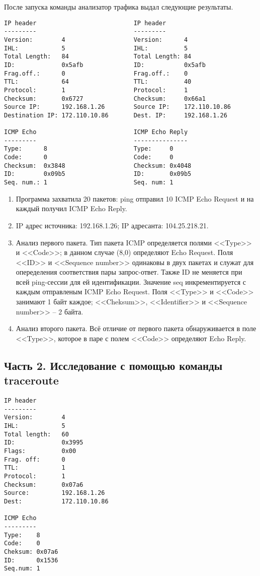 \documentclass[12pt, a4paper] {ncc}
\begin{document}
    После запуска команды анализатор трафика выдал следующие результаты.
    \begin{verbatim}
IP header                           IP header
---------                           ---------
Version:        4                   Version:      4
IHL:            5                   IHL:          5
Total Length:   84                  Total Length: 84
ID:             0x5afb              ID:           0x5afb
Frag.off.:      0                   Frag.off.:    0
TTL:            64                  TTL:          40
Protocol:       1                   Protocol:     1
Checksum:       0x6727              Checksum:     0x66a1
Source IP:      192.168.1.26        Source IP:    172.110.10.86
Destination IP: 172.110.10.86       Dest. IP:     192.168.1.26

ICMP Echo                           ICMP Echo Reply
---------                           ---------------
Type:      8                        Type:     0
Code:      0                        Code:     0
Checksum:  0x3848                   Checksum: 0x4048
ID:        0x09b5                   ID:       0x09b5
Seq. num.: 1                        Seq. num: 1
    \end{verbatim}
    \begin{enumerate}
        \item Программа захватила 20 пакетов: ping  отправил 10 ICMP Echo Request и на каждый получил
              ICMP Echo Reply.
        \item IP адрес источника: 192.168.1.26; IP адресанта: 104.25.218.21.
        \item Анализ первого пакета. Тип пакета ICMP определяется полями <<Type>> и <<Code>>; в данном случае
              (8,0) определяют Echo Request. Поля <<ID>> и <<Sequence number>> одинаковы в двух пакетах и служат 
              для опеределения соответствия пары запрос-ответ. Также ID не меняется при всей ping-сессии для ей 
              идентификации. Значение seq инкрементируется с каждым отправленым ICMP Echo Request.
              Поля <<Type>> и <<Code>> занимают 1 байт каждое; <<Cheksum>>, <<Identifier>> и
              <<Sequence number>> -- 2 байта.
        \item Анализ второго пакета. Всё отличие от первого пакета обнаруживается в поле <<Type>>,
              которое в паре с полем <<Code>> определяют Echo Reply.
    \end{enumerate}

    \subsection*{Часть 2. Исследование с помощью команды traceroute}
\begin{verbatim}
IP header
---------
Version:        4
IHL:            5
Total length:   60
ID:             0x3995
Flags:          0x00
Frag. off:      0
TTL:            1
Protocol:       1
Checksum:       0x07a6
Source:         192.168.1.26
Dest:           172.110.10.86

ICMP Echo
---------
Type:    8
Code:    0
Cheksum: 0x07a6
ID:      0x1536
Seq.num: 1
\end{verbatim}
\end{document}

